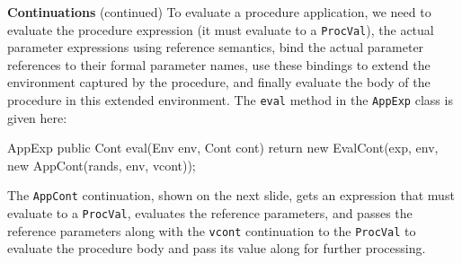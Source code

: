 \begin{minipage}[t]{\sw}
\slidenumber
\LARGE
{\bf Continuations} (continued)\exx
To evaluate a procedure application,
we need to evaluate the procedure expression
(it must evaluate to a \verb'ProcVal'),
the actual parameter expressions using reference semantics,
bind the actual parameter references to their formal parameter names,
use these bindings to extend the environment captured by the procedure,
and finally evaluate the body of the procedure in this extended environment.
The \verb'eval' method in the \verb'AppExp' class
is given here:
\Large
\begin{qv}
AppExp
public Cont eval(Env env, Cont cont) {
    return new EvalCont(exp,
                        env,
                        new AppCont(rands, env, vcont));
}
\end{qv}
\LARGE
The \verb'AppCont' continuation, shown on the next slide,
gets an expression that must evaluate to a \verb'ProcVal',
evaluates the reference parameters,
and passes the reference parameters along
with the \verb'vcont' continuation to the \verb'ProcVal'
to evaluate the procedure body
and pass its value along for further processing.
\end{minipage}
